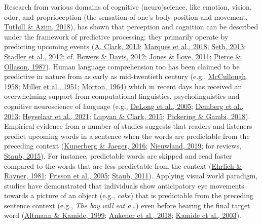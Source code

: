 \documentclass[a4paper, nobind]{templates/ociamthesis}
\begin{document}
Research from various domains of cognitive (neuro)science, like emotion, vision, odor, and proprioception (the sensation of one's body position and movement, \protect\hyperlink{ref-Tuthill2018}{Tuthill \& Azim, 2018}), has shown that perception and cognition can be described under the framework of predictive processing; they primarily operate by predicting upcoming events (\protect\hyperlink{ref-Clark2013}{A. Clark, 2013}; \protect\hyperlink{ref-Marques2018}{Marques et al., 2018}; \protect\hyperlink{ref-Seth2013}{Seth, 2013}; \protect\hyperlink{ref-Stadler2012}{Stadler et al., 2012}; cf. \protect\hyperlink{ref-Bowers2012}{Bowers \& Davis, 2012}; \protect\hyperlink{ref-Jones2011}{Jones \& Love, 2011}; \protect\hyperlink{ref-Pierce1987}{Pierce \& Ollason, 1987}).
Human language comprehension too has been claimed to be predictive in nature from as early as mid-twentieth century (e.g., \protect\hyperlink{ref-Mccullough1958}{McCullough, 1958}; \protect\hyperlink{ref-Miller1951}{Miller et al., 1951}; \protect\hyperlink{ref-Morton1964}{Morton, 1964})
which in recent days has received an overwhelming support from computational linguistics, psycholinguistics and cognitive neuroscience of language (e.g., \protect\hyperlink{ref-Delong2005}{DeLong et al., 2005}; \protect\hyperlink{ref-Demberg2013}{Demberg et al., 2013}; \protect\hyperlink{ref-Heyselaar2021}{Heyselaar et al., 2021}; \protect\hyperlink{ref-Lupyan2015}{Lupyan \& Clark, 2015}; \protect\hyperlink{ref-Pickering2018}{Pickering \& Gambi, 2018}).
Empirical evidence from a number of studies suggests that readers and listeners predict upcoming words in a sentence when the words are predictable from the preceding context (\protect\hyperlink{ref-Kuperberg2016}{Kuperberg \& Jaeger, 2016}; \protect\hyperlink{ref-Nieuwland2019}{Nieuwland, 2019}; for reviews, \protect\hyperlink{ref-Staub2015}{Staub, 2015}).
For instance, predictable words are skipped and read faster compared to the words that are less predictable from the context (\protect\hyperlink{ref-Ehrlich1981}{Ehrlich \& Rayner, 1981}; \protect\hyperlink{ref-Frisson2005}{Frisson et al., 2005}; \protect\hyperlink{ref-Staub2011}{Staub, 2011}).
Applying visual world paradigm, studies have demonstrated that individuals show anticipatory eye movements towards a picture of an object (e.g., \emph{cake}) that is predictable from the preceding sentence context (e.g., \emph{The boy will eat a\ldots{}}) even before hearing the final target word (\protect\hyperlink{ref-Altmann1999}{Altmann \& Kamide, 1999}; \protect\hyperlink{ref-Ankener2018}{Ankener et al., 2018}; \protect\hyperlink{ref-Kamide2003}{Kamide et al., 2003}).
\end{document}
